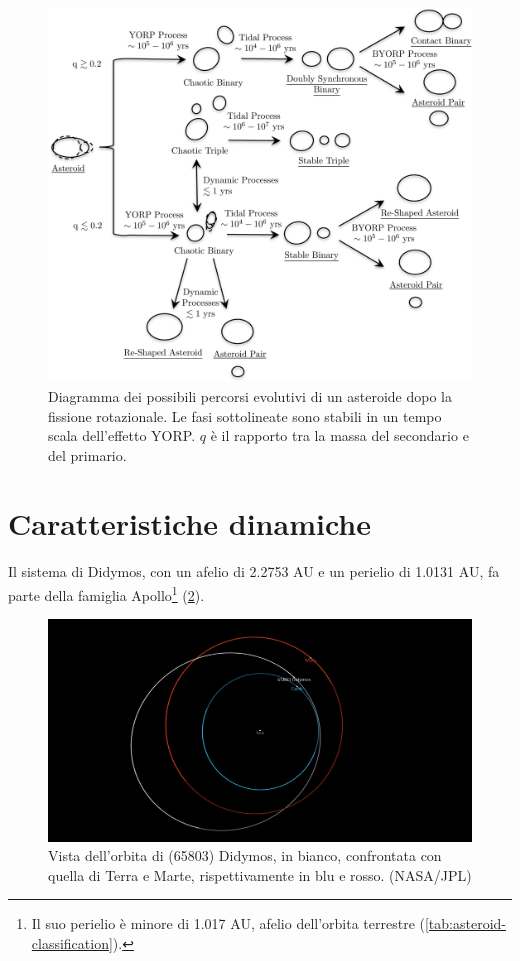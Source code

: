 \begin{figure}[!h]
    \centering
    \includegraphics[scale=0.65]{figure/binaries_evolution.jpg}
    \caption[Diagramma dei possibili percorsi evolutivi di un piccolo asteroide.]{Diagramma dei possibili percorsi evolutivi di un asteroide dopo la fissione rotazionale. Le fasi sottolineate sono stabili in un tempo scala dell'effetto YORP. $q$ è il rapporto tra la massa del secondario e del primario. \citep{jacobson_dynamics_2011}}
    \label{fig:binaries_evolution}
\end{figure}

\section{Caratteristiche dinamiche}
Il sistema di Didymos, con un afelio di 2.2753 AU e un perielio di 1.0131 AU, fa parte della famiglia Apollo\footnote{Il suo perielio è minore di 1.017 AU, afelio dell'orbita terrestre (\cref{tab:asteroid-classification}).} (\cref{fig:orbit_view}).

\begin{figure}[!h]
    \centering
    \includegraphics[scale=0.18]{figure/orbit_viewer.jpg}
    \caption[Vista dell'orbita di (65803) Didymos.]{Vista dell'orbita di (65803) Didymos, in bianco, confrontata con quella di Terra e Marte, rispettivamente in blu e rosso. (NASA/JPL)}
    \label{fig:orbit_view}
\end{figure}

